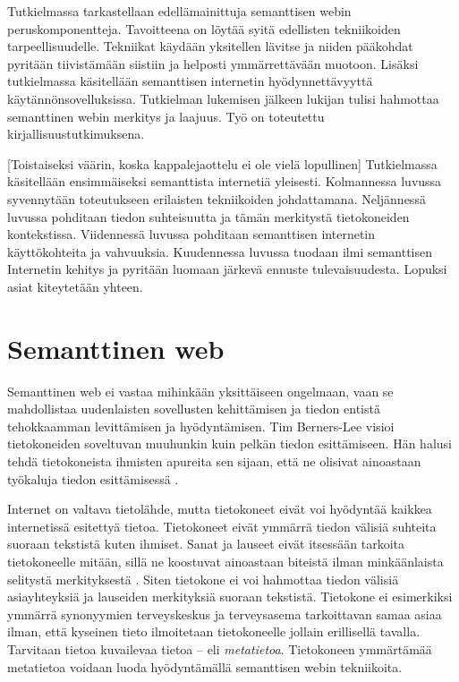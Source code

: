 \documentclass[finnish, 12pt, a4paper, elec, utf8, pdfa, online]{aaltothesis}
\begin{document}
Tutkielmassa tarkastellaan edellämainittuja semanttisen webin peruskomponentteja. Tavoitteena on löytää syitä edellisten tekniikoiden tarpeellisuudelle. Tekniikat käydään yksitellen lävitse ja niiden pääkohdat pyritään tiivistämään siistiin ja helposti ymmärrettävään muotoon. Lisäksi tutkielmassa käsitellään semanttisen internetin hyödynnettävyyttä käytännönsovelluksissa. Tutkielman lukemisen jälkeen lukijan tulisi hahmottaa semanttinen webin merkitys ja laajuus. Työ on toteutettu kirjallisuustutkimuksena.

[Toistaiseksi väärin, koska kappalejaottelu ei ole vielä lopullinen]
Tutkielmassa käsitellään ensimmäiseksi semanttista internetiä yleisesti. Kolmannessa luvussa syvennytään toteutukseen erilaisten tekniikoiden johdattamana. Neljännessä luvussa pohditaan tiedon suhteisuutta ja tämän merkitystä tietokoneiden kontekstissa. Viidennessä luvussa pohditaan semanttisen internetin käyttökohteita ja vahvuuksia. Kuudennessa luvussa tuodaan ilmi semanttisen Internetin kehitys ja pyritään luomaan järkevä ennuste tulevaisuudesta. Lopuksi asiat kiteytetään yhteen.

\clearpage %
\section{Semanttinen web}

Semanttinen web ei vastaa mihinkään yksittäiseen ongelmaan, vaan se mahdollistaa uudenlaisten sovellusten kehittämisen ja tiedon entistä tehokkaamman levittämisen ja hyödyntämisen. Tim Berners-Lee visioi tietokoneiden soveltuvan muuhunkin kuin pelkän tiedon esittämiseen. Hän halusi tehdä tietokoneista ihmisten apureita sen sijaan, että ne olisivat ainoastaan työkaluja tiedon esittämisessä \cite{Berners_visio}.

Internet on valtava tietolähde, mutta tietokoneet eivät voi hyödyntää kaikkea internetissä esitettyä tietoa. Tietokoneet eivät ymmärrä tiedon välisiä suhteita suoraan tekstistä kuten ihmiset. Sanat ja lauseet eivät itsessään tarkoita tietokoneelle mitään, sillä ne koostuvat ainoastaan biteistä ilman minkäänlaista selitystä merkityksestä \cite{ASCII}. Siten tietokone ei voi hahmottaa tiedon välisiä asiayhteyksiä ja lauseiden merkityksiä suoraan tekstistä. Tietokone ei esimerkiksi ymmärrä synonyymien terveyskeskus ja terveysasema tarkoittavan samaa asiaa ilman, että kyseinen tieto ilmoitetaan tietokoneelle jollain erillisellä tavalla. Tarvitaan tietoa kuvailevaa tietoa -- eli \textit{metatietoa}. Tietokoneen ymmärtämää metatietoa voidaan luoda hyödyntämällä semanttisen webin tekniikoita.
\end{document}
